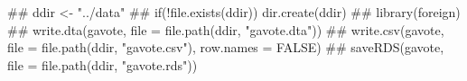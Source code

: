 \begin{Schunk}
\begin{Sinput}
 ## ddir <- "../data"
 ## if(!file.exists(ddir)) dir.create(ddir)
 ## library(foreign)
 ## write.dta(gavote, file = file.path(ddir, "gavote.dta"))
 ## write.csv(gavote, file = file.path(ddir, "gavote.csv"), row.names = FALSE)
 ## saveRDS(gavote, file = file.path(ddir, "gavote.rds"))
\end{Sinput}
\end{Schunk}
